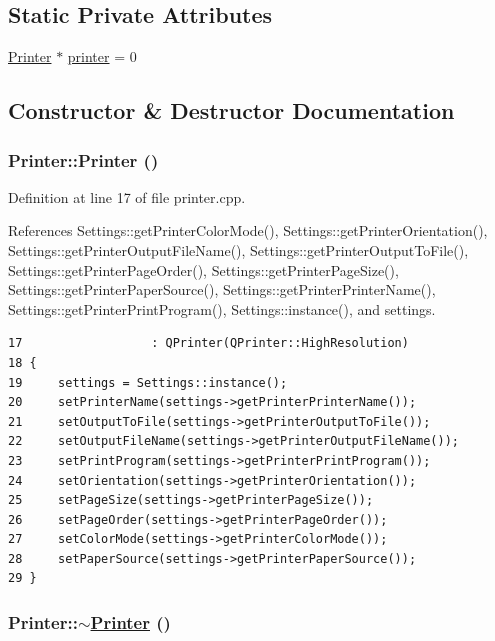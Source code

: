 \subsection*{Static Private Attributes}
\begin{CompactItemize}
\item 
\hyperlink{classPrinter}{Printer} $\ast$ \hyperlink{classPrinter_v0}{printer} = 0
\end{CompactItemize}


\subsection{Constructor \& Destructor Documentation}
\hypertarget{classPrinter_d0}{
\subsubsection[Printer]{\setlength{\rightskip}{0pt plus 5cm}Printer::Printer ()}}
\label{classPrinter_d0}


Definition at line 17 of file printer.cpp.

References Settings::get\-Printer\-Color\-Mode(), Settings::get\-Printer\-Orientation(), Settings::get\-Printer\-Output\-File\-Name(), Settings::get\-Printer\-Output\-To\-File(), Settings::get\-Printer\-Page\-Order(), Settings::get\-Printer\-Page\-Size(), Settings::get\-Printer\-Paper\-Source(), Settings::get\-Printer\-Printer\-Name(), Settings::get\-Printer\-Print\-Program(), Settings::instance(), and settings.

\footnotesize\begin{verbatim}17                  : QPrinter(QPrinter::HighResolution)
18 {
19     settings = Settings::instance();
20     setPrinterName(settings->getPrinterPrinterName());
21     setOutputToFile(settings->getPrinterOutputToFile());
22     setOutputFileName(settings->getPrinterOutputFileName());
23     setPrintProgram(settings->getPrinterPrintProgram());
24     setOrientation(settings->getPrinterOrientation());
25     setPageSize(settings->getPrinterPageSize());
26     setPageOrder(settings->getPrinterPageOrder());
27     setColorMode(settings->getPrinterColorMode());
28     setPaperSource(settings->getPrinterPaperSource());
29 }
\end{verbatim}\normalsize 


\hypertarget{classPrinter_d1}{
\subsubsection[$\sim$Printer]{\setlength{\rightskip}{0pt plus 5cm}Printer::$\sim$\hyperlink{classPrinter}{Printer} ()}}
\label{classPrinter_d1}


